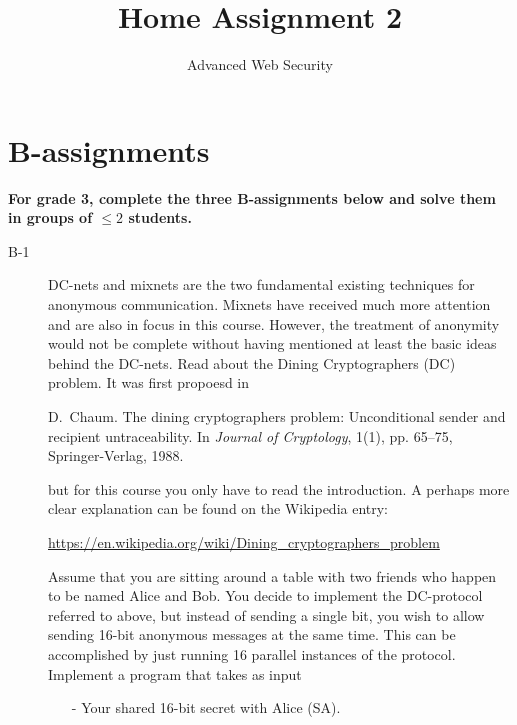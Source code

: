 \documentclass{article}
\begin{document}
\title{Home Assignment 2}
\author{Advanced Web Security}
\date{\the\year}

\maketitle

\section*{B-assignments}
\textbf{For grade 3, complete the three B-assignments below and solve them in groups of $\leq 2$ students.}

\begin{description}


	\item[B-1]{DC-nets and mixnets are the two fundamental existing techniques for anonymous communication. Mixnets have received much more attention and are also in focus in this course. However, the treatment of anonymity would not be complete without having mentioned at least the basic ideas behind the DC-nets. Read about the Dining Cryptographers (DC) problem. It was first propoesd in
	\begin{center}
		\begin{minipage}{0.8\textwidth}
			D.~Chaum. The dining cryptographers problem: Unconditional sender and recipient untraceability. In \textit{Journal of Cryptology}, 1(1), pp. 65--75, Springer-Verlag, 1988.
		\end{minipage}
	\end{center}
	but for this course you only have to read the introduction. A perhaps more clear explanation can be found on the Wikipedia entry:
	\begin{center}
		\begin{minipage}{0.8\textwidth}
			\url{https://en.wikipedia.org/wiki/Dining_cryptographers_problem}
		\end{minipage}
	\end{center}
	Assume that you are sitting around a table with two friends who happen to be named Alice and Bob. You decide to implement the DC-protocol referred to above, but instead of sending a single bit, you wish to allow sending 16-bit anonymous messages at the same time. This can be accomplished by just running 16 parallel instances of the protocol. Implement a program that takes as input
	\begin{itemize}
		\item[-] Your shared 16-bit secret with Alice (SA).

\end{itemize}}
\end{description}
\end{document}
